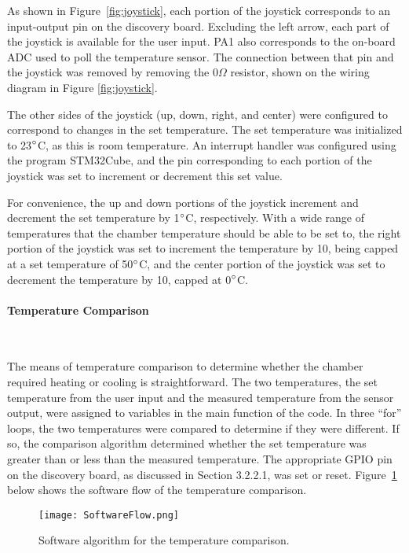 \documentclass[11pt,letter]{article}
\begin{document}
As shown in Figure~\ref{fig:joystick}, each portion of the joystick corresponds to an input-output pin on the discovery board. Excluding the left arrow, each part of the joystick is available for the user input. PA1 also corresponds to the on-board ADC used to poll the temperature sensor. The connection between that pin and the joystick was removed by removing the 0$\Omega$ resistor, shown on the wiring diagram in Figure \ref{fig:joystick}. 

The other sides of the joystick (up, down, right, and center) were configured to correspond to changes in the set temperature. The set temperature was initialized to 23$\degree$C, as this is room temperature. An interrupt handler was configured using the program STM32Cube, and the pin corresponding to each portion of the joystick was set to increment or decrement this set value. 

For convenience, the up and down portions of the joystick increment and decrement the set temperature by 1$\degree$C, respectively. With a wide range of temperatures that the chamber temperature should be able to be set to, the right portion of the joystick was set to increment the temperature by 10, being capped at a set temperature of 50$\degree$C, and the center portion of the joystick was set to decrement the temperature by 10, capped at 0$\degree$C.

\paragraph{Temperature Comparison} \

The means of temperature comparison to determine whether the chamber required heating or cooling is straightforward. The two temperatures, the set temperature from the user input and the measured temperature from the sensor output, were assigned to variables in the main function of the code. In three ``for'' loops, the two temperatures were compared to determine if they were different. If so, the comparison algorithm determined whether the set temperature was greater than or less than the measured temperature. The appropriate GPIO pin on the discovery board, as discussed in Section 3.2.2.1, was set or reset. Figure~\ref{fig:software} below shows the software flow of the temperature comparison. 

\begin{figure}[H]
    \centering
    \texttt{[image: SoftwareFlow.png]}
    \caption{Software algorithm for the temperature comparison.}
    \label{fig:software}
\end{figure}
\end{document}
